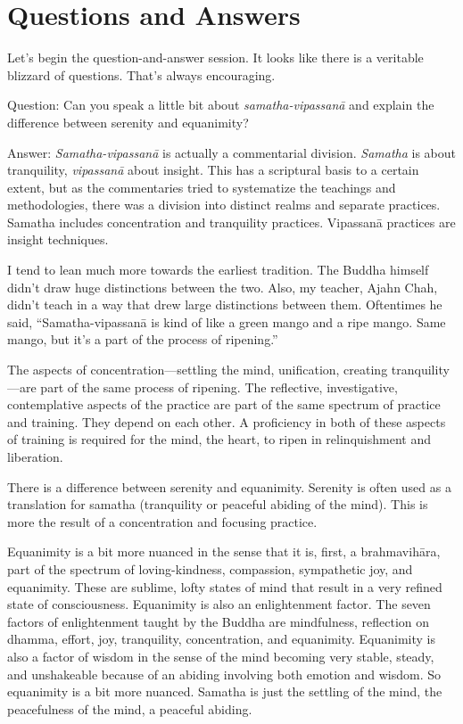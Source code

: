 \chapter{Questions and Answers}

Let’s begin the question-and-answer session. It looks like there is a
veritable blizzard of questions. That’s always encouraging.

\qaspace
Question: Can you speak a little bit about \emph{samatha-vipassanā} and
explain the difference between serenity and equanimity?

\qaspace
Answer: \emph{Samatha-vipassanā} is actually a commentarial division.
\emph{Samatha} is about tranquility, \emph{vipassanā} about insight.
This has a scriptural basis to a certain extent, but as the commentaries
tried to systematize the teachings and methodologies, there was a
division into distinct realms and separate practices. Samatha includes
concentration and tranquility practices. Vipassanā practices are insight
techniques.

I tend to lean much more towards the earliest tradition. The Buddha
himself didn’t draw huge distinctions between the two. Also, my teacher,
Ajahn Chah, didn’t teach in a way that drew large distinctions between
them. Oftentimes he said, “Samatha-vipassanā is kind of like a green
mango and a ripe mango. Same mango, but it’s a part of the process of
ripening.”

The aspects of concentration—settling the mind, unification, creating
tranquility—are part of the same process of ripening. The reflective,
investigative, contemplative aspects of the practice are part of the
same spectrum of practice and training. They depend on each other. A
proficiency in both of these aspects of training is required for the
mind, the heart, to ripen in relinquishment and liberation.

There is a difference between serenity and equanimity. Serenity is often
used as a translation for samatha (tranquility or peaceful abiding of
the mind). This is more the result of a concentration and focusing
practice.

Equanimity is a bit more nuanced in the sense that it is, first, a
brahmavihāra, part of the spectrum of loving-kindness, compassion,
sympathetic joy, and equanimity. These are sublime, lofty states of mind
that result in a very refined state of consciousness. Equanimity is also
an enlightenment factor. The seven factors of enlightenment taught by
the Buddha are mindfulness, reflection on dhamma, effort, joy,
tranquility, concentration, and equanimity. Equanimity is also a factor
of wisdom in the sense of the mind becoming very stable, steady, and
unshakeable because of an abiding involving both emotion and wisdom. So
equanimity is a bit more nuanced. Samatha is just the settling of the
mind, the peacefulness of the mind, a peaceful abiding.

